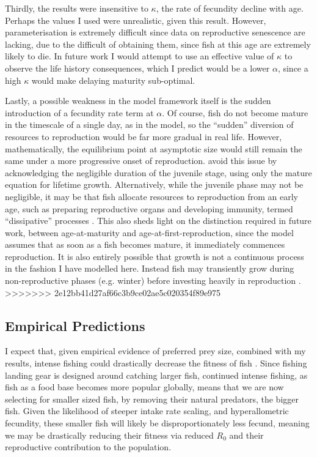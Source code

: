 \documentclass[a4paper]{article} %
\begin{document}
\begin{center}
\begin{minipage}{\linewidth}
Thirdly, the results were insensitive to $\kappa$, the rate of fecundity decline with age. Perhaps the values I used were unrealistic, given this result. However, parameterisation is extremely difficult since data on reproductive senescence are lacking, due to the difficult of obtaining them, since fish at this age are extremely likely to die. In future work I would attempt to use an effective value of $\kappa$ to observe the life history consequences, which I predict would be a lower $\alpha$, since a high $\kappa$ would make delaying maturity sub-optimal.

Lastly, a possible weakness in the model framework itself is the sudden introduction of a fecundity rate term at $\alpha$. Of course, fish do not become mature in the timescale of a single day, as in the model, so the ``sudden'' diversion of resources to reproduction would be far more gradual in real life. However, mathematically, the equilibrium point at asymptotic size would still remain the same under a more progressive onset of reproduction. \textcite{West2001} avoid this issue by acknowledging the negligible duration of the juvenile stage, using only the mature equation for lifetime growth. Alternatively, while the juvenile phase may not be negligible, it may be that fish allocate resources to reproduction from an early age, such as preparing reproductive organs and developing immunity, termed ``dissipative'' processes \autocite{kooijman2010dynamic, Kearney2012a}. This also sheds light on the distinction required in future work, between age-at-maturity and age-at-first-reproduction, since the model assumes that as soon as a fish becomes mature, it immediately commences reproduction. It is also entirely possible that growth is not a continuous process in the fashion I have modelled here. Instead fish may transiently grow during non-reproductive phases (e.g. winter) before investing heavily in reproduction \autocite{Kozowski1987-indeterminate}.
>>>>>>> 2e12bb41d27af66c3b9ce02ae5c020354f89e975


\subsection{Empirical Predictions}
I expect that, given empirical evidence of preferred prey size, combined with my results, intense fishing could drastically decrease the fitness of fish \autocite{Brose2006, Barnes2010, VanGemert2019}. Since fishing landing gear is designed around catching larger fish, continued intense fishing, as fish as a food base becomes more popular globally, means that we are now selecting for smaller sized fish, by removing their natural predators, the bigger fish. Given the likelihood of steeper intake rate scaling, and hyperallometric fecundity, these smaller fish will likely be disproportionately less fecund, meaning we may be drastically reducing their fitness via reduced $R_0$ and their reproductive contribution to the population.


\end{minipage}
\end{center}
\end{document}
